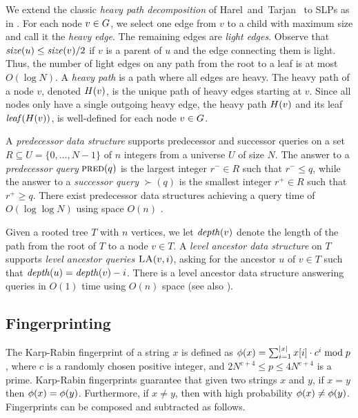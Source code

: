 We extend the classic \emph{heavy path decomposition} of Harel~and~Tarjan~\cite{harel1984fast} to SLPs as in \cite{bille2011random}. For each node $v \in G$, we select one edge from $v$ to a child with maximum size and call it the \emph{heavy edge}. The remaining edges are \emph{light edges}. Observe that $\mathit{size}(u) \leq \mathit{size}(v)/2$ if $v$ is a parent of $u$ and the edge connecting them is light. Thus, the number of light edges on any path from the root to a leaf is at most $O(\log N)$. 
A \emph{heavy path} is a path where all edges are heavy. The heavy path of a node $v$, denoted $H(v)$, is the unique path of heavy edges starting at $v$. Since all nodes only have a single outgoing heavy edge, the heavy path $H(v)$ and its leaf $\mathit{leaf}(H(v))$, is well-defined for each node $v \in G$.



A \emph{predecessor data structure} supports predecessor and successor queries on a set $R \subseteq U = \{ 0, \ldots, N-1 \}$ of $n$ integers from a universe $U$ of size $N$. The answer to a \emph{predecessor query} $\textsc{pred}(q)$ is the largest integer $r^- \in R$ such that $r^- \leq q$, while the answer to a \emph{successor query} $\succ(q)$ is the smallest integer $r^+ \in R$ such that $r^+ \geq q$. There exist predecessor data structures achieving a query time of $O(\log \log N)$ using space $O(n)$ \cite{van1976design, mehlhorn1990bounded, willard1983log}.

Given a rooted tree $T$ with $n$ vertices, we let $\mathit{depth}(v)$ denote the length of the path from the root of $T$ to a node $v \in T$. A \emph{level ancestor data structure} on $T$ supports \emph{level ancestor queries} $\textsc{LA}(v, i)$, asking for the ancestor $u$ of $v \in T$ such that $\mathit{depth}(u) = \mathit{depth}(v)-i$. There is a level ancestor data structure answering queries in $O(1)$ time using $O(n)$ space \cite{dietz1991finding} (see also \cite{berkman1994finding, alstrup2000improved, bender2004level}).

\subsection{Fingerprinting}
The Karp-Rabin fingerprint \cite{karp1987efficient} of a string $x$ is defined as $\phi(x) = \sum_{i=1}^{|x|} x[i] \cdot c^i \bmod p$, where $c$ is a randomly chosen positive integer, and $2N^{c+4} \leq p \leq 4N^{c+4}$ is a prime. Karp-Rabin fingerprints guarantee that given two strings $x$ and $y$, if $x = y$ then $\phi(x) = \phi(y)$. Furthermore, if $x \neq y$, then with high probability $\phi(x) \neq \phi(y)$. Fingerprints can be composed and subtracted as follows.

